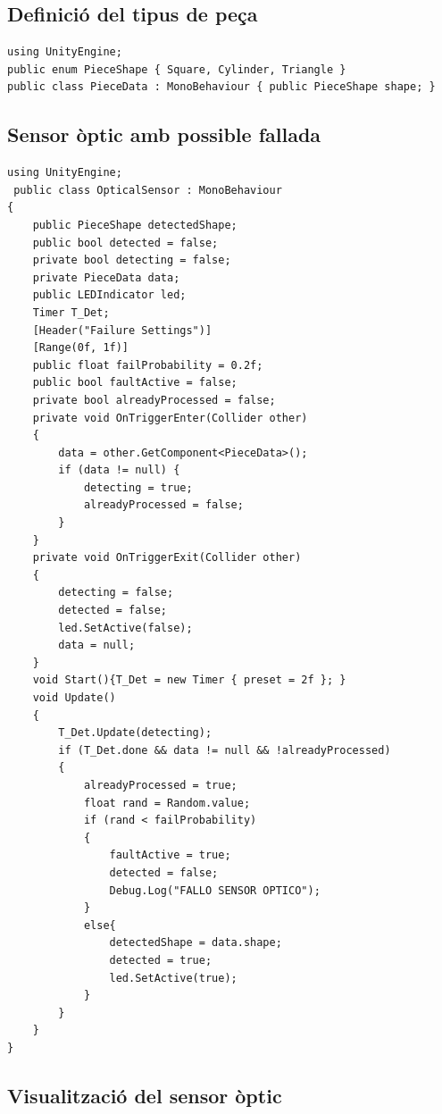 \documentclass[a4paper,11pt,DIV=13,headings=normal,abstract=true,twoside=semi]{article}
\begin{document}
\subsection*{Definició del tipus de peça}

\begin{lstlisting}[style=modern, caption={Definició del tipus de peça}, label={lst:pieshapedata}]
using UnityEngine;
public enum PieceShape { Square, Cylinder, Triangle }
public class PieceData : MonoBehaviour { public PieceShape shape; }
\end{lstlisting}

\subsection*{Sensor òptic amb possible fallada}

\begin{lstlisting}[style=modern, caption={Sensor òptic}, label={lst:opticalsensor}]
using UnityEngine;
 public class OpticalSensor : MonoBehaviour
{
    public PieceShape detectedShape;
    public bool detected = false;
    private bool detecting = false;
    private PieceData data;
    public LEDIndicator led;
    Timer T_Det;
    [Header("Failure Settings")]
    [Range(0f, 1f)]
    public float failProbability = 0.2f; 
    public bool faultActive = false;
    private bool alreadyProcessed = false; 
    private void OnTriggerEnter(Collider other)
    {
        data = other.GetComponent<PieceData>();
        if (data != null) {
            detecting = true; 
            alreadyProcessed = false; 
        }
    }
    private void OnTriggerExit(Collider other)
    {
        detecting = false; 
        detected = false;
        led.SetActive(false);
        data = null;
    }
    void Start(){T_Det = new Timer { preset = 2f }; }
    void Update()
    {
        T_Det.Update(detecting);
        if (T_Det.done && data != null && !alreadyProcessed)
        {
            alreadyProcessed = true;
            float rand = Random.value;
            if (rand < failProbability)
            {
                faultActive = true;
                detected = false;
                Debug.Log("FALLO SENSOR OPTICO");
            }
            else{
                detectedShape = data.shape;
                detected = true;
                led.SetActive(true);
            }
        }
    }
}
\end{lstlisting}

\subsection*{Visualització del sensor òptic}
\end{document}
